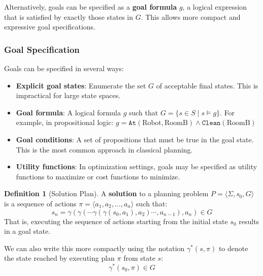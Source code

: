 \documentclass[11pt,a4paper]{article}
\theoremstyle{definition}
\newtheorem{definition}{Definition}[section]
\theoremstyle{plain}
\theoremstyle{remark}
\begin{document}
Alternatively, goals can be specified as a \textbf{goal formula} $g$, a logical expression that is satisfied by exactly those states in $G$. This allows more compact and expressive goal specifications.

\subsubsection{Goal Specification}

Goals can be specified in several ways:

\begin{itemize}
    \item \textbf{Explicit goal states}: Enumerate the set $G$ of acceptable final states. This is impractical for large state spaces.
    
    \item \textbf{Goal formula}: A logical formula $g$ such that $G = \{s \in S \mid s \models g\}$. For example, in propositional logic: $g = \texttt{At}(\text{Robot}, \text{RoomB}) \land \texttt{Clean}(\text{RoomB})$
    
    \item \textbf{Goal conditions}: A set of propositions that must be true in the goal state. This is the most common approach in classical planning.
    
    \item \textbf{Utility functions}: In optimization settings, goals may be specified as utility functions to maximize or cost functions to minimize.
\end{itemize}

\begin{tcolorbox}[colback=orange!5!white,colframe=orange!75!black,title=\textbf{Solution Plan}]
\begin{definition}[Solution Plan]
A \textbf{solution} to a planning problem $P = \langle \Sigma, s_0, G \rangle$ is a sequence of actions $\pi = \langle a_1, a_2, \dots, a_n \rangle$ such that:
\[
s_n = \gamma(\gamma(\cdots \gamma(\gamma(s_0, a_1), a_2) \cdots, a_{n-1}), a_n) \in G
\]
That is, executing the sequence of actions starting from the initial state $s_0$ results in a goal state.
\end{definition}
\end{tcolorbox}

We can also write this more compactly using the notation $\gamma^*(s, \pi)$ to denote the state reached by executing plan $\pi$ from state $s$:
\[
\gamma^*(s_0, \pi) \in G
\]
\end{document}
